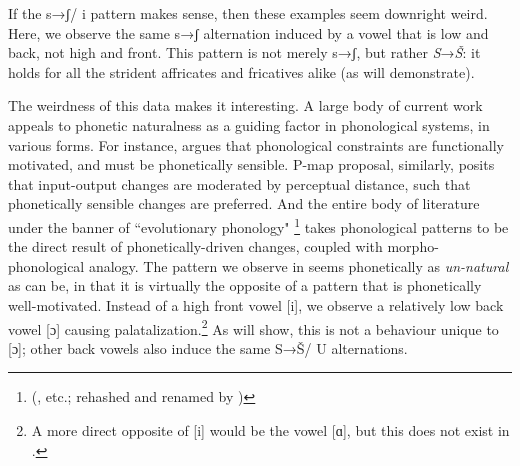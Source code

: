 If the s→ʃ/ {\longrule} i pattern makes sense, then these examples seem downright weird. Here, we observe the same s→ʃ alternation induced by a vowel that is low and back, not high and front. This pattern is not merely s→ʃ, but rather \textit{S}→\textit{Š}: it holds for all the strident affricates and fricatives alike (as  will demonstrate).

The weirdness of this data makes it interesting. A large body of current work appeals to phonetic naturalness as a guiding factor in phonological systems, in various forms. For instance, \citet{Hayes1999} argues that phonological constraints are functionally motivated, and must be phonetically sensible.  P-map proposal, similarly, posits that input-output changes are moderated by perceptual distance, such that phonetically sensible changes are preferred. And the entire body of literature under the banner of ``evolutionary phonology"
\footnote{(\citealt{Ohala1981,Ohala1990,Ohala:2004aa}, etc.; rehashed and renamed by \citealt{Blevins2004})} takes phonological patterns to be the direct result of phonetically-driven changes, coupled with morpho-phonological analogy. The pattern we observe in  seems phonetically as \textit{un-natural} as can be, in that it is virtually the opposite of a pattern that is phonetically well-motivated. Instead of a high front vowel [i], we observe a relatively low back vowel [ɔ] causing palatalization.\footnote{A more direct opposite of [i] would be the vowel [ɑ], but this does not exist in .} As  will show, this is not a behaviour unique to [ɔ]; other back vowels also induce the same S→Š/ {\longrule} U alternations.

